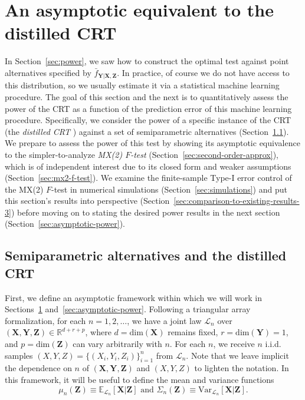 \documentclass[12pt]{article}
\theoremstyle{definition}
\theoremstyle{remark}
\newcommand{\prx}{\bm X}
\newcommand{\srx}{X}
\newcommand{\prz}{\bm Z}
\newcommand{\srz}{Z}
\newcommand{\pry}{{\bm Y}}
\newcommand{\sry}{Y}
\begin{document}
\section{An asymptotic equivalent to the distilled CRT} \label{sec:weakening}

In Section~\ref{sec:power}, we saw how to construct the optimal test against point alternatives specified by $\bar f_{\pry|\prx,\prz}$. In practice, of course we do not have access to this distribution, so we usually estimate it via a statistical machine learning procedure. The goal of this section and the next is to quantitatively assess the power of the CRT as a function of the prediction error of this machine learning procedure. Specifically, we consider  the power of a specific instance of the CRT (the \textit{distilled CRT} \cite{Liu2020})  against a set of semiparametric alternatives (Section~\ref{sec:asymptotic-setup}). We prepare to assess the power of this test by showing its asymptotic equivalence to the simpler-to-analyze \textit{MX(2) $F$-test} (Section~\ref{sec:second-order-approx}), which is of independent interest due to its closed form and weaker assumptions (Section~\ref{sec:mx2-f-test}). We examine the finite-sample Type-I error control of the MX(2) $F$-test in numerical simulations (Section~\ref{sec:simulations}) and put this section's results into perspective (Section~\ref{sec:comparison-to-existing-results-3}) before moving on to stating the desired power results in the next section (Section~\ref{sec:asymptotic-power}).


\subsection{Semiparametric alternatives and the distilled CRT} \label{sec:asymptotic-setup}

First, we define an asymptotic framework within which we will work in Sections~\ref{sec:weakening} and~\ref{sec:asymptotic-power}. Following a triangular array formalization, for each $n = 1, 2, \dots$, we have a joint law $\mathcal L_n$ over $(\prx, \pry, \prz) \in \mathbb R^{d + r + p}$, where $d = \text{dim}(\prx)$ remains fixed, $r = \text{dim}(\pry) = 1$, and $p = \text{dim}(\prz)$ can vary arbitrarily with $n$. For each $n$, we receive $n$ i.i.d. samples $(\srx, \sry, \srz) = \{(\srx_i, \sry_i, \srz_i)\}_{i = 1}^n$ from $\mathcal L_n$. Note that we leave implicit the dependence on $n$ of $(\prx,\pry,\prz)$ and $(X,Y,Z)$ to lighten the notation. In this framework, it will be useful to define the mean and variance functions
\begin{equation}
	\mu_n(\prz) \equiv \mathbb E_{\mathcal L_n}[\prx|\prz]  \text{ and } \Sigma_n(\prz) \equiv \text{Var}_{\mathcal L_n}[\prx|\prz].
	\label{eq:conditional-mean-variance}
\end{equation}
\end{document}
